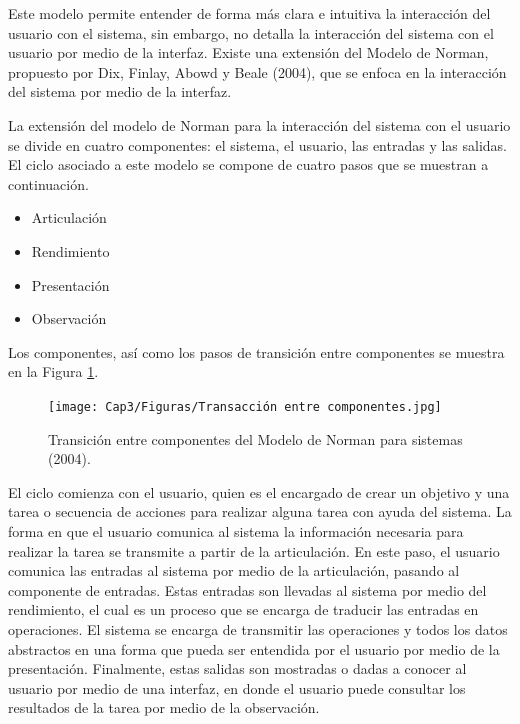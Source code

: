 Este modelo permite entender de forma más clara e intuitiva la interacción del usuario con el sistema, sin embargo, no detalla la interacción del sistema con el usuario por medio de la interfaz. Existe una extensión del Modelo de Norman, propuesto por Dix, Finlay, Abowd y Beale (2004), que se enfoca en la interacción del sistema por medio de la interfaz. 

La extensión del modelo de Norman para la interacción del sistema con el usuario se divide en cuatro componentes: el sistema, el usuario, las entradas y las salidas. El ciclo asociado a este modelo se compone de cuatro pasos que se muestran a continuación.

\begin{itemize}
  \item Articulación
  \item Rendimiento
  \item Presentación
  \item Observación
\end{itemize}

Los componentes, así como los pasos de transición entre componentes se muestra en la Figura \ref{fig:31}.

\begin{figure}[H]
  \centering
  \texttt{[image: Cap3/Figuras/Transacción entre componentes.jpg]}
  \caption{Transición entre componentes del Modelo de Norman para sistemas (2004).}
  \label{fig:31}
\end{figure}

El ciclo comienza con el usuario, quien es el encargado de crear un objetivo y una tarea o secuencia de acciones para realizar alguna tarea con ayuda del sistema. La forma en que el usuario comunica al sistema la información necesaria para realizar la tarea se transmite a partir de la articulación. En este paso, el usuario comunica las entradas al sistema por medio de la articulación, pasando al componente de entradas. Estas entradas son llevadas al sistema por medio del rendimiento, el cual es un proceso que se encarga de traducir las entradas en operaciones. El sistema se encarga de transmitir las operaciones y todos los datos abstractos en una forma que pueda ser entendida por el usuario por medio de la presentación. Finalmente, estas salidas son mostradas o dadas a conocer al usuario por medio de una interfaz, en donde el usuario puede consultar los resultados de la tarea por medio de la observación.

